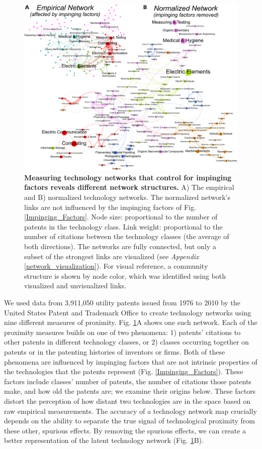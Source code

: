 \documentclass[]{svjour3}
\begin{document}
\begin{figure}[ht!]
\begin{center}
\includegraphics[width=\textwidth]{figs/Networks.pdf} 
\end{center}
\caption{\textbf{Measuring technology networks that control for impinging factors reveals different network structures.} A) The empirical and B) normalized technology networks. The normalized network's links are not influenced by the impinging factors of Fig. \ref{Impinging_Factors}. Node size: proportional to the number of patents in the technology class. Link weight: proportional to the number of citations between the technology classes (the average of both directions). The networks are fully connected, but only a subset of the strongest links are visualized (see \textit{Appendix} \ref{network_visualization}). For visual reference, a community structure is shown by node color, which was identified using both visualized and unvisualized links.
}\label{Empirical_Normalized_Networks}
\end{figure}

We used data from 3,911,050 utility patents issued from 1976 to 2010 by the United States Patent and Trademark Office to create technology networks using nine different measures of proximity. Fig. \ref{Empirical_Normalized_Networks}A shows one such network. Each of the proximity measures builds on one of two phenomena: 1) patents' citations to other patents in different technology classes, or 2) classes occurring together on patents or in the patenting histories of inventors or firms. Both of these phenomena are influenced by impinging factors that are not intrinsic properties of the technologies that the patents represent (Fig. \ref{Impinging_Factors}). These factors include classes' number of patents, the number of citations those patents make, and how old the patents are; we examine their origins below. These factors distort the perception of how distant two technologies are in the space based on raw empirical measurements. The accuracy of a technology network map crucially depends on the ability to separate the true signal of technological proximity from these other, spurious effects. By removing the spurious effects, we can create a better representation of the latent technology network (Fig. \ref{Empirical_Normalized_Networks}B).
\end{document}
